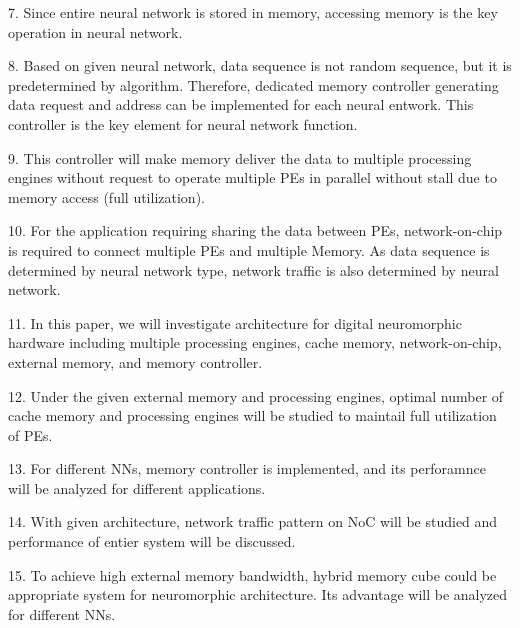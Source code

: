 \documentclass[pageno]{jpaper}
\begin{document}
7. Since entire neural network is stored in memory, accessing memory is the key operation in neural network. 

8. Based on given neural network, data sequence is not random sequence, but it is predetermined by algorithm. Therefore, dedicated memory controller generating data request and address can be implemented for each neural entwork. This controller is the key element for neural network function. 

9. This controller will make memory deliver the data to multiple processing engines without request to operate multiple PEs in parallel without stall due to memory access (full utilization).

10. For the application requiring sharing the data between PEs, network-on-chip is required to connect multiple PEs and multiple Memory. As data sequence is determined by neural network type, network traffic is also determined by neural network.

11. In this paper, we will investigate architecture for digital neuromorphic hardware including multiple processing engines, cache memory, network-on-chip, external memory, and memory controller.

12. Under the given external memory and processing engines, optimal number of cache memory and processing engines  will be studied to maintail full utilization of PEs.

13. For different NNs, memory controller is implemented, and its perforamnce will be analyzed for different applications. 

14. With given architecture, network traffic pattern on NoC will be studied and performance of entier system will be discussed.

15. To achieve high external memory bandwidth, hybrid memory cube could be appropriate system for neuromorphic architecture. Its advantage will be analyzed for different NNs.


%
%
\end{document}

